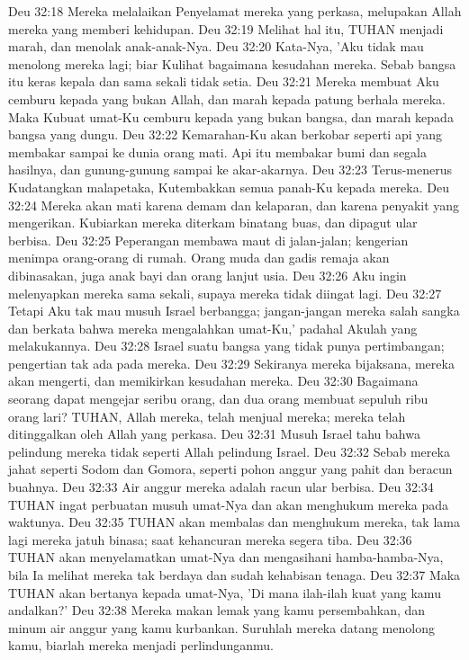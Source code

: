 Deu 32:18  Mereka melalaikan Penyelamat mereka yang perkasa, melupakan Allah mereka yang memberi kehidupan.
Deu 32:19  Melihat hal itu, TUHAN menjadi marah, dan menolak anak-anak-Nya.
Deu 32:20  Kata-Nya, 'Aku tidak mau menolong mereka lagi; biar Kulihat bagaimana kesudahan mereka. Sebab bangsa itu keras kepala dan sama sekali tidak setia.
Deu 32:21  Mereka membuat Aku cemburu kepada yang bukan Allah, dan marah kepada patung berhala mereka. Maka Kubuat umat-Ku cemburu kepada yang bukan bangsa, dan marah kepada bangsa yang dungu.
Deu 32:22  Kemarahan-Ku akan berkobar seperti api yang membakar sampai ke dunia orang mati. Api itu membakar bumi dan segala hasilnya, dan gunung-gunung sampai ke akar-akarnya.
Deu 32:23  Terus-menerus Kudatangkan malapetaka, Kutembakkan semua panah-Ku kepada mereka.
Deu 32:24  Mereka akan mati karena demam dan kelaparan, dan karena penyakit yang mengerikan. Kubiarkan mereka diterkam binatang buas, dan dipagut ular berbisa.
Deu 32:25  Peperangan membawa maut di jalan-jalan; kengerian menimpa orang-orang di rumah. Orang muda dan gadis remaja akan dibinasakan, juga anak bayi dan orang lanjut usia.
Deu 32:26  Aku ingin melenyapkan mereka sama sekali, supaya mereka tidak diingat lagi.
Deu 32:27  Tetapi Aku tak mau musuh Israel berbangga; jangan-jangan mereka salah sangka dan berkata bahwa mereka mengalahkan umat-Ku,' padahal Akulah yang melakukannya.
Deu 32:28  Israel suatu bangsa yang tidak punya pertimbangan; pengertian tak ada pada mereka.
Deu 32:29  Sekiranya mereka bijaksana, mereka akan mengerti, dan memikirkan kesudahan mereka.
Deu 32:30  Bagaimana seorang dapat mengejar seribu orang, dan dua orang membuat sepuluh ribu orang lari? TUHAN, Allah mereka, telah menjual mereka; mereka telah ditinggalkan oleh Allah yang perkasa.
Deu 32:31  Musuh Israel tahu bahwa pelindung mereka tidak seperti Allah pelindung Israel.
Deu 32:32  Sebab mereka jahat seperti Sodom dan Gomora, seperti pohon anggur yang pahit dan beracun buahnya.
Deu 32:33  Air anggur mereka adalah racun ular berbisa.
Deu 32:34  TUHAN ingat perbuatan musuh umat-Nya dan akan menghukum mereka pada waktunya.
Deu 32:35  TUHAN akan membalas dan menghukum mereka, tak lama lagi mereka jatuh binasa; saat kehancuran mereka segera tiba.
Deu 32:36  TUHAN akan menyelamatkan umat-Nya dan mengasihani hamba-hamba-Nya, bila Ia melihat mereka tak berdaya dan sudah kehabisan tenaga.
Deu 32:37  Maka TUHAN akan bertanya kepada umat-Nya, 'Di mana ilah-ilah kuat yang kamu andalkan?'
Deu 32:38  Mereka makan lemak yang kamu persembahkan, dan minum air anggur yang kamu kurbankan. Suruhlah mereka datang menolong kamu, biarlah mereka menjadi perlindunganmu.
